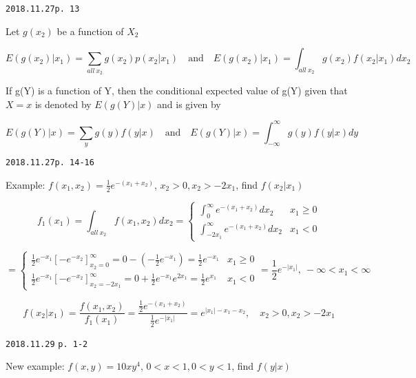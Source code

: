 \documentclass[]{tufte-book}
\begin{document}
\texttt{2018.11.27\textasciigrave{}\textasciigrave{}p.\ 13}

Let \(g(x_2)\) be a function of \(X_2\)

\[E(g(x_2)|x_1)=\sum_{all\ x_2}g(x_2)p(x_2|x_1)\quad \text{and}\quad E(g(x_2)|x_1)=\int_{all\ x_2}g(x_2)f(x_2|x_1)dx_2\]

If g(Y) is a function of Y, then the conditional expected value of g(Y)
given that \(X=x\) is denoted by \(E(g(Y)|x)\) and is given by

\[E(g(Y)|x)=\sum_yg(y)f(y|x)\quad \text{and}\quad E(g(Y)|x)=\int_{-\infty}^{\infty}g(y)f(y|x)dy\]

\texttt{2018.11.27\textasciigrave{}\textasciigrave{}p.\ 14-16}

Example: \(f(x_1,x_2)=\frac12e^{-(x_1+x_2)}\), \(x_2>0,x_2>-2x_1\), find
\(f(x_2|x_1)\)

\[f_1(x_1)=\int_{all\ x_2}f(x_1,x_2)dx_2=\begin{cases}\int_0^{\infty}e^{-(x_1+x_2)}dx_2 & x_1\ge0 \\ \int_{-2x_1}^{\infty}e^{-(x_1+x_2)}dx_2 & x_1<0 \end{cases}\]

\[=\begin{cases}\frac12e^{-x_1}[{-e^{-x_2}}]_{x_2=0}^{\infty}=0-(-\frac12e^{-x_1})=\frac12e^{-x_1} & x_1\ge0 \\ \frac12e^{-x_1}[{-e^{-x_2}}]_{x_2=-2x_1}^{\infty}=0+\frac12e^{-x_1}e^{2x_1}=\frac12e^{x_1} & x_1<0 \end{cases}=\frac12e^{-|x_1|},\ -\infty<x_1<\infty\]

\[f(x_2|x_1)=\frac{f(x_1,x_2)}{f_1(x_1)}=\frac{\frac12e^{-(x_1+x_2)}}{\frac12e^{-|x_1|}}=e^{|x_1|-x_1-x_2},\quad x_2>0,x_2>-2x_1\]

\texttt{2018.11.29} \texttt{p.\ 1-2}

New example: \(f(x,y)=10xy^4\), \(0<x<1, 0<y<1\), find \(f(y|x)\)
\end{document}

